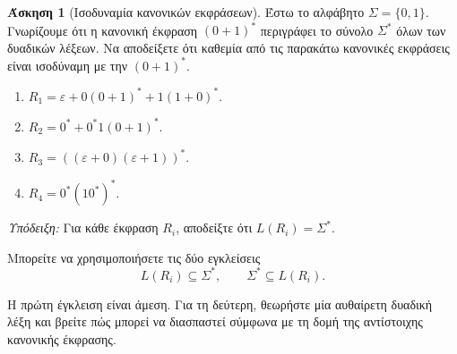 \documentclass[11pt,a4paper]{article}
\newcommand{\eps}{\varepsilon}
\theoremstyle{definition}
\newtheorem{question}{Άσκηση}
\begin{document}
\begin{question}[Ισοδυναμία κανονικών εκφράσεων]

Έστω το αλφάβητο $\Sigma=\{0,1\}$.
Γνωρίζουμε ότι η κανονική έκφραση
$(0+1)^*$ 
περιγράφει το σύνολο $\Sigma^*$ όλων
των δυαδικών λέξεων.
Να αποδείξετε ότι καθεμία από τις παρακάτω
κανονικές εκφράσεις είναι ισοδύναμη
με την $(0+1)^*$.

\begin{enumerate}

\item
$ 
    R_1=\eps+0(0+1)^*+1(1+0)^*.
$ 

\item
$R_2=0^*+0^*1(0+1)^*.$

\item
$ 
    R_3=((\eps+0)(\eps+1))^*.$

\item
$ R_4=0^*(10^*)^*.$

\end{enumerate}

\textit{Υπόδειξη:}
Για κάθε έκφραση $R_i$, αποδείξτε ότι $L(R_i)=\Sigma^*.$

Μπορείτε να χρησιμοποιήσετε τις δύο εγκλείσεις
\[
    L(R_i)\subseteq\Sigma^*,
    \qquad
    \Sigma^*\subseteq L(R_i).
\]

Η πρώτη έγκλειση είναι άμεση.
Για τη δεύτερη, θεωρήστε μία αυθαίρετη
δυαδική λέξη και βρείτε πώς μπορεί
να διασπαστεί σύμφωνα με τη δομή
της αντίστοιχης κανονικής έκφρασης.

\end{question}
\end{document}
